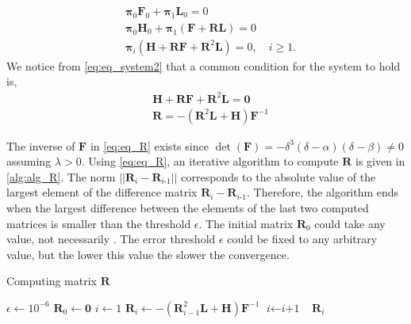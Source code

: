 \documentclass[sigconf,draft]{acmart}
\begin{document}
\begin{equation}
  \begin{split}
  & \bm{\pi}_0\bm{F}_0 + \bm{\pi}_1\bm{L}_0 = 0 \\
  & \bm{\pi}_0\bm{H}_0 + \bm{\pi}_1(\bm{F} + \bm{RL}) = 0 \\
  & \bm{\pi}_i(\bm{H} + \bm{RF} + \bm{R}^2\bm{L}) = 0, \quad i \geq 1.
  \end{split}
  \label{eq:eq_system2}
\end{equation}
We notice from \eqref{eq:eq_system2} that a common condition for the system to hold is,
\begin{equation}
  \begin{split}
    & \bm{H}+\bm{RF}+\bm{R}^2\bm{L} = \bm{0} \\
	& \bm{R} = -\left(\bm{R}^2\bm{L}+\bm{H}\right)\bm{F}^{-1}
  \end{split}
  \label{eq:eq_R}
\end{equation}

The inverse of $\bm{F}$ in \eqref{eq:eq_R} exists since $\det(\bm{F}) = -\delta^3(\delta-\alpha)(\delta-\beta)\neq 0$ assuming $\lambda > 0$. Using \eqref{eq:eq_R}, an iterative algorithm to compute $\bm{R}$ is given in \ref{alg:alg_R}. The norm $\left||\bm{R}_\textit{i}-\bm{R}_\textit{i-1}\right||$ corresponds to the absolute value of the largest element of the difference matrix $\bm{R}_\textit{i}-\bm{R}_\textit{i-1}$. Therefore, the algorithm ends when the largest difference between the elements of the last two computed matrices is smaller than the threshold $\epsilon$. The initial matrix $\bm{R}_0$ could take any value, not necessarily . The error threshold $\epsilon$ could be fixed to any arbitrary value, but the lower this value the slower the convergence.
\begin{algorithm}
  \caption{Computing matrix $\bm{R}$}\label{alg:alg_R}
  \begin{algorithmic}[1]
  \State $\epsilon \gets 10^{-6}$
  \State $\bm{R}_0 \gets \bm{0}$
  \State $\textit{i} \gets 1$
  \State $\bm{R}_i \gets -\left(\bm{R}_{i-1}^2\bm{L}+\bm{H}\right)\bm{F}^{-1}$
  \State $\textit{i} \gets \textit{i+1}$
  \Else\ \Return $\bm{R}_i$
  \EndIf
  \EndWhile
  \EndProcedure
  \end{algorithmic}
\end{algorithm}
\end{document}
